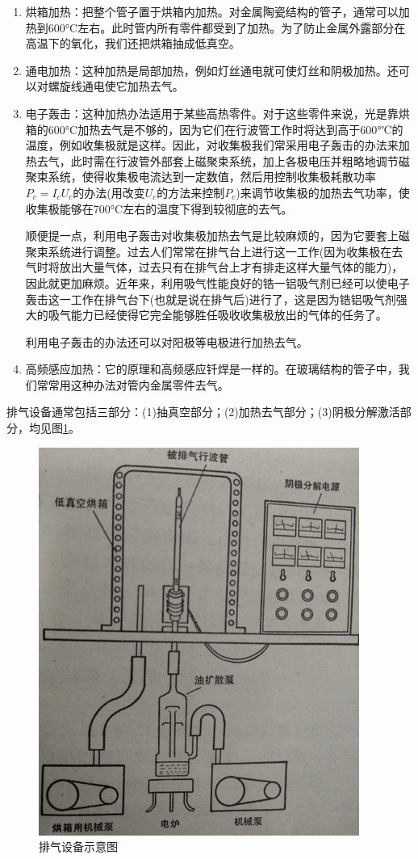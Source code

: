 \begin{enumerate}
	\item 烘箱加热：把整个管子置于烘箱内加热。对金属陶瓷结构的管子，通常可以加热到600\si{\degreeCelsius}左右。此时管内所有零件都受到了加热。为了防止金属外露部分在高温下的氧化，我们还把烘箱抽成低真空。
	\item 通电加热：这种加热是局部加热，例如灯丝通电就可使灯丝和阴极加热。还可以对螺旋线通电使它加热去气。
	\item 电子轰击：这种加热办法适用于某些高热零件。对于这些零件来说，光是靠烘箱的600\si{\degreeCelsius}加热去气是不够的，因为它们在行波管工作时将达到高于600°℃的温度，例如收集极就是这样。因此，对收集极我们常采用电子轰击的办法来加热去气，此时需在行波管外部套上磁聚束系统，加上各极电压并粗略地调节磁聚束系统，使得收集极电流达到一定数值，然后用控制收集极耗散功率$ P_c = I_cU_c $的办法(用改变$ U_c $的方法来控制$ P_c $)来调节收集极的加热去气功率，使收集极能够在700\si{\degreeCelsius}左右的温度下得到较彻底的去气。
	
	顺便提一点，利用电子轰击对收集极加热去气是比较麻烦的，因为它要套上磁聚束系统进行调整。过去人们常常在排气台上进行这一工作(因为收集极在去气时将放出大量气体，过去只有在排气台上才有排走这样大量气体的能力)，因此就更加麻烦。近年来，利用吸气性能良好的锆一铝吸气剂已经可以使电子轰击这一工作在排气台下(也就是说在排气后)进行了，这是因为锆铝吸气剂强大的吸气能力已经使得它完全能够胜任吸收收集极放出的气体的任务了。
	
	
	利用电子轰击的办法还可以对阳极等电极进行加热去气。
	\item 高频感应加热：它的原理和高频感应钎焊是一样的。在玻璃结构的管子中，我们常常用这种办法对管内金属零件去气。
	
\end{enumerate}

排气设备通常包括三部分：(1)抽真空部分；(2)加热去气部分；(3)阴极分解激活部分，均见图\ref{ch10-13}。
\begin{figure}[phtb]
	\centering
	\includegraphics[width=0.6\linewidth]{figure/ch10-13}
	\caption{ 排气设备示意图}
	\label{ch10-13}
\end{figure}

